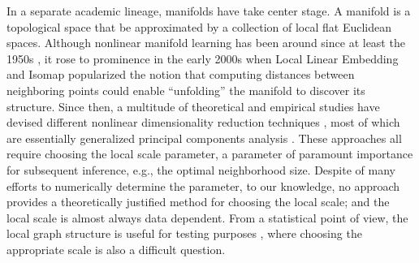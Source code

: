 \documentclass[11pt]{article}
\begin{document}
In a separate academic lineage, manifolds have take center stage.  A manifold is a topological space that be approximated by a collection of local flat Euclidean spaces.  Although nonlinear manifold learning has been around since at least the 1950s \cite{TorgersonBook}, it rose to prominence in the early 2000s when Local Linear Embedding \cite{SaulRoweis2000} and Isomap \cite{TenenbaumSilvaLangford2000} popularized the notion that computing distances between neighboring points could enable ``unfolding'' the manifold to discover its structure.  Since then, a multitude of theoretical and empirical studies have devised different nonlinear dimensionality reduction techniques \cite{LeeVerleysen2007}, most of which are essentially generalized principal components analysis \cite{ScholkopfSmolaMuller1999}.  These approaches all require choosing the local scale parameter, a parameter of paramount importance for subsequent inference, e.g., the optimal neighborhood size. Despite of many efforts to numerically determine the parameter, to our knowledge, no approach provides a theoretically justified method for choosing the local scale; and the local scale is almost always data dependent. From a statistical point of view, the local graph structure is useful for testing purposes \cite{David1966,Friedman1983,Schilling1986,Dumcke2014}, where choosing the appropriate scale is also a difficult question.
\end{document}
